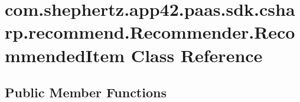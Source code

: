 \hypertarget{classcom_1_1shephertz_1_1app42_1_1paas_1_1sdk_1_1csharp_1_1recommend_1_1_recommender_1_1_recommended_item}{\section{com.\+shephertz.\+app42.\+paas.\+sdk.\+csharp.\+recommend.\+Recommender.\+Recommended\+Item Class Reference}
\label{classcom_1_1shephertz_1_1app42_1_1paas_1_1sdk_1_1csharp_1_1recommend_1_1_recommender_1_1_recommended_item}
}
\subsection*{Public Member Functions}
